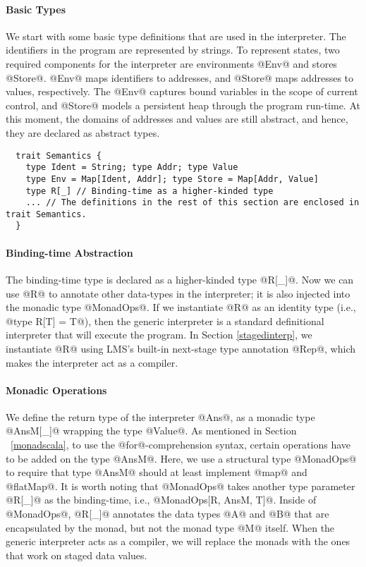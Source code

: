 \paragraph{Basic Types}
We start with some basic type definitions that are used in the interpreter. The
identifiers in the program are represented by strings. To represent states, two
required components for the interpreter are environments @Env@ and stores
@Store@. @Env@ maps identifiers to addresses, and @Store@ maps
addresses to values, respectively. The @Env@ captures bound variables in the
scope of current control, and @Store@ models a persistent heap through the
program run-time.  At this moment, the domains of addresses and values are
still abstract, and hence, they are declared as abstract types.
\begin{lstlisting}
  trait Semantics {
    type Ident = String; type Addr; type Value
    type Env = Map[Ident, Addr]; type Store = Map[Addr, Value]
    type R[_] // Binding-time as a higher-kinded type
    ... // The definitions in the rest of this section are enclosed in trait Semantics.
  }
\end{lstlisting}

\paragraph{Binding-time Abstraction}
The binding-time type is declared as a higher-kinded type @R[_]@.
Now we can use @R@ to annotate other data-types in the interpreter;
it is also injected into the monadic type @MonadOps@.  If we instantiate
@R@ as an identity type (i.e., @type R[T] = T@), then the generic interpreter is a
standard definitional interpreter that will execute the program.  In Section
\ref{stagedinterp}, we instantiate @R@ using LMS's built-in next-stage
type annotation @Rep@, which makes the interpreter act as a compiler.

\paragraph{Monadic Operations} We define the return type of the interpreter
@Ans@, as a monadic type @AnsM[_]@ wrapping the type @Value@.
As mentioned in Section ~\ref{monadscala}, to use the @for@-comprehension
syntax, certain operations have to be added on the type @AnsM@. Here, we use a
structural type @MonadOps@ to require that type @AnsM@ should at least
implement @map@ and @flatMap@. It is worth noting that @MonadOps@ takes another
type parameter @R[_]@ as the binding-time, i.e., @MonadOps[R, AnsM, T]@.
Inside of @MonadOps@, @R[_]@ annotates the data types @A@ and @B@ that are
encapsulated by the monad, but not the monad type @M@ itself. When the generic
interpreter acts as a compiler, we will replace the monads with the ones that
work on staged data values.

